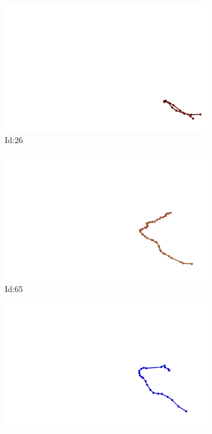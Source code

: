 \documentclass[12pt,twoside]{report}
\begin{document}
\begin{figure}
\centering
\begin{subfigure}[b]{0.20\textwidth}
\centering
\includegraphics[width=\textwidth]{../trajectories/26.png}
\caption{Id:26}
\end{subfigure}
\begin{subfigure}[b]{0.20\textwidth}
\centering
\includegraphics[width=\textwidth]{../trajectories/65.png}
\caption{Id:65}
\end{subfigure}
\begin{subfigure}[b]{0.20\textwidth}
\centering
\includegraphics[width=\textwidth]{../trajectories/74.png}

\end{subfigure}
\end{figure}
\end{document}
